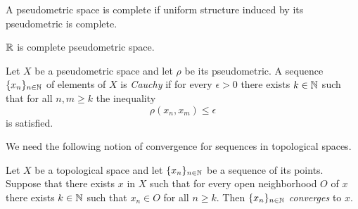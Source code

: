 \begin{definition}
	A pseudometric space is complete if uniform structure induced by its pseudometric is complete.
\end{definition}

\begin{example}\label{example:real_line_is_complete}
	${\mathbb R}$ is complete pseudometric space.
\end{example}

\begin{definition}
	Let $X$ be a pseudometric space and let $\rho$ be its pseudometric. A sequence $\{x_n\}_{n \in {\mathbb N}}$ of elements of $X$ is \textit{Cauchy} if for every $\epsilon > 0$ there exists $k \in {\mathbb N}$ such that for all $n,m \geq k$ the inequality
	$$\rho(x_n,x_m) \leq \epsilon$$
	is satisfied.
\end{definition}
\noindent
We need the following notion of convergence for sequences in topological spaces.

\begin{definition}
	Let $X$ be a topological space and let $\{x_n\}_{n \in {\mathbb N}}$ be a sequence of its points. Suppose that there exists $x$ in $X$ such that for every open neighborhood $O$ of $x$ there exists $k \in {\mathbb N}$ such that $x_n \in O$ for all $n \geq k$. Then $\{x_n\}_{n\in {\mathbb N}}$ \textit{converges} to $x$.
\end{definition}


